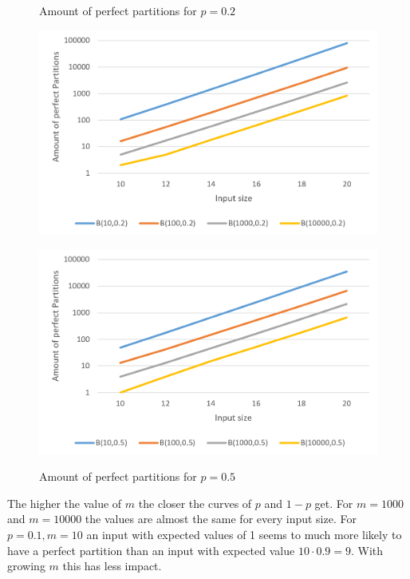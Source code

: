 \begin{figure}[h]
      \centering
      \begin{minipage}[b]{0.45\textwidth}
            \caption{Amount of perfect partitions for $p=0.2$}
            \includegraphics[width=\textwidth]{figures/images/solvabilityOfInputs/perfectPartitionCount-p0_2.png}
      \end{minipage}
      \hspace{0.75cm}
      \begin{minipage}[b]{0.45\textwidth}
            \caption{Amount of perfect partitions for $p=0.5$}
            \includegraphics[width=\textwidth]{figures/images/solvabilityOfInputs/perfectPartitionCount-p0_5.png}\label{fig:lastBinSolCount}
      \end{minipage}
\end{figure}

The higher the value of $m$ the closer the curves of $p$ and $1-p$ get.
For $m=1000$ and $m=10000$ the values are almost the same for every input size.
For $p=0.1, m=10$ an input with expected values of 1 seems to much more likely to have a perfect partition than an input with expected value $10\cdot0.9=9$.
With growing $m$ this has less impact.

